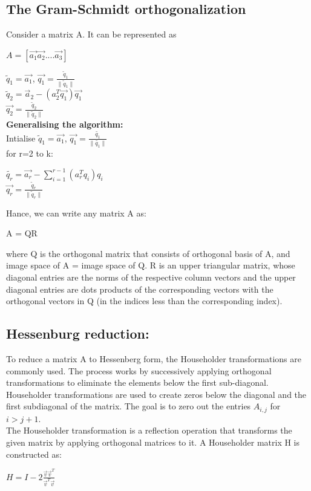 \documentclass[journal]{IEEEtran}
\begin{document}
\subsection{The Gram-Schmidt orthogonalization}
Consider a matrix A. It can be represented as 
\begin{center}
    $A=\left[\vec{a_1} \vec{a_2}....\vec{a_3}\right]$
\end{center}
$\tilde{q}_1 = \vec{a_1}$, $\vec{q_1}=\frac{\tilde{q}_1}{\|\tilde{q}_1\|}$\\
$\tilde{q}_2 = \vec{a}_2 - (a_2^T\vec{q_1})\vec{q_1}$\\
$\vec{q_2}=\frac{\tilde{q}_2}{\|\tilde{q}_2\|}$\\
\textbf{Generalising the algorithm:}\\
Intialise $\tilde{q}_1=\vec{a_1}$, $\vec{q_1}=\frac{\tilde{q_1}}{\|\tilde{q_1}\|}$\\
for r=2 to k:\\
\begin{center}
$\tilde{q_r} = \vec{a_r} - $\(\sum_{i=1}^{r-1} (a_r^Tq_i)q_i\)\\
$\vec{q_r}=\frac{\tilde{q}_r}{\|\tilde{q}_r\|}$
\end{center}
Hance, we can write any matrix A as: 
\begin{center}
A = QR\\

\end{center}
where Q is the orthogonal matrix that consists of orthogonal basis of A, and image space of A = image space of Q.
R is an upper triangular matrix, whose diagonal entries are the norms of the respective column vectors and the upper diagonal entries are dots products of the corresponding vectors with the orthogonal vectors in Q (in the indices less than the corresponding index).
\subsection{Hessenburg reduction:}
To reduce a matrix A to Hessenberg form, the Householder transformations are commonly used. The process works by successively applying orthogonal transformations to eliminate the elements below the first sub-diagonal.\\
Householder transformations are used to create zeros below the diagonal and the first subdiagonal of the matrix. The goal is to zero out the entries $A_{i,j}$ for $i>j+1.$\\
The Householder transformation is a reflection operation that transforms the given matrix by applying orthogonal matrices to it. A Householder matrix H is constructed as:
\begin{center}
  $H=I-2\frac{\vec{v}\vec{v}^T}{\vec{v}^T\vec{v}}$
\end{center}
\end{document}
